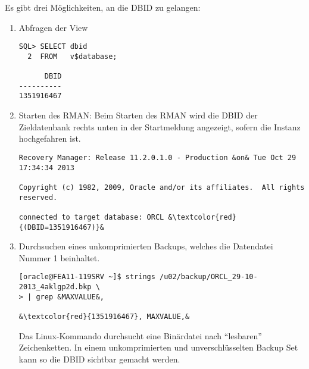           Es gibt drei M\"oglichkeiten, an die DBID zu gelangen:
            \begin{enumerate}
              \item Abfragen der View 
                \begin{lstlisting}[caption={Abfragen von \identifier{v\$database}},label=admin1415,language=oracle_sql]
SQL> SELECT dbid
  2  FROM   v$database;

      DBID
----------
1351916467
                \end{lstlisting}
              \item Starten des RMAN: Beim Starten des RMAN wird die DBID der Zieldatenbank rechts unten in der Startmeldung angezeigt, sofern die Instanz hochgefahren ist.
                \begin{lstlisting}[caption={Startmeldung des RMAN},label=admin1416,language=terminal]
Recovery Manager: Release 11.2.0.1.0 - Production &on& Tue Oct 29 17:34:34 2013

Copyright (c) 1982, 2009, Oracle and/or its affiliates.  All rights reserved.

connected to target database: ORCL &\textcolor{red}{(DBID=1351916467)}&
                \end{lstlisting}
              \item Durchsuchen eines unkomprimierten Backups, welches die Datendatei Nummer 1 beinhaltet.
                \begin{lstlisting}[caption={Die DBID in einem Backup Set suchen},label=admin1417,language=terminal]
[oracle@FEA11-119SRV ~]$ strings /u02/backup/ORCL_29-10-2013_4aklgp2d.bkp \
> | grep &MAXVALUE&,

&\textcolor{red}{1351916467}, MAXVALUE,&
                \end{lstlisting}
                Das Linux-Kommando  durchsucht eine Bin\"ardatei nach \enquote{lesbaren} Zeichenketten. In einem unkomprimierten und unverschl\"usselten Backup Set kann so die DBID sichtbar gemacht werden.
              \end{enumerate}
